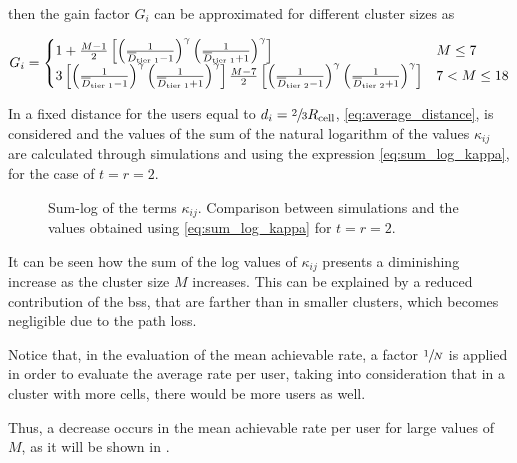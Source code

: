 \noindent
then the gain factor $G_i$ can be approximated for different cluster sizes as

\begin{equation} \label{eq:cluster_gain_value}
    G_i = \begin{cases}
    1 + \frac{M - 1}{2}\left[ \left( \frac{1}{\overline{D}_{\text{tier 1}} - 1}\right)^{\gamma}
    \left( \frac{1}{\overline{D}_{\text{tier 1}} + 1}\right)^{\gamma} \right]
    & M \leq 7 \\
    3 \left[ \left( \frac{1}{\overline{D}_{\text{tier 1}} - 1}\right)^{\gamma}
    \left( \frac{1}{\overline{D}_{\text{tier 1}} + 1}\right)^{\gamma} \right]
    \frac{M - 7}{2} \left[ \left( \frac{1}{\overline{D}_{\text{tier 2}} - 1}\right)^{\gamma}
    \left( \frac{1}{\overline{D}_{\text{tier 2}} + 1}\right)^{\gamma} \right]
    & 7 < M \leq 18
    \end{cases}
\end{equation}

In  a fixed distance for the users equal to $d_{i} =
\sfrac{2}{3}R_{\text{cell}}$, \eqref{eq:average_distance}, is considered and the values
of the sum of the natural logarithm of the values $\kappa_{ij}$ are calculated
through simulations and using the expression \eqref{eq:sum_log_kappa}, for the
case of $t = r = 2$.

\begin{figure}[t]
\begin{center}
    \hspace*{1mm}
\end{center}
\caption{Sum-log of the terms $\kappa_{ij}$. Comparison between simulations and
the values obtained using \eqref{eq:sum_log_kappa} for $ t = r = 2$.}
\label{fig:sum_log_kappa}
\end{figure}

It can be seen how the sum of the log values of $\kappa_{ij}$ presents a
diminishing increase as the cluster size $M$ increases. This can be explained by
a reduced contribution of the \glspl{bs}, that are farther than in smaller
clusters, which becomes negligible due to the path loss.

Notice that, in the evaluation of the mean achievable rate, a factor
$\sfrac{1}{N}$ is applied in order to evaluate the average rate per user, taking
into consideration that in a cluster with more cells, there would be more users
as well.

Thus, a decrease occurs in the mean achievable rate per user for large values of
$M$, as it will be shown in .


